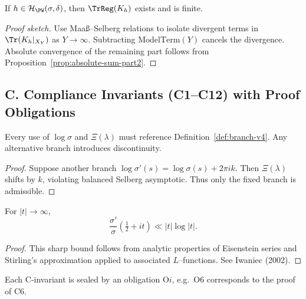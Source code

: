 \begin{lemma}\label{lem:existence-trreg}
If $h\in\mathcal H_{\PW}(\sigma,\delta)$, then $\TrReg(K_h)$ exists and is finite.
\end{lemma}

\begin{proof}[Proof sketch]
Use Maaß–Selberg relations to isolate divergent terms in $\Tr(K_h|_{X_Y})$ as $Y\to\infty$. Subtracting $\text{ModelTerm}(Y)$ cancels the divergence. Absolute convergence of the remaining part follows from Proposition~\ref{prop:absolute-sum-part2}.
\end{proof}


\subsection*{C. Compliance Invariants (C1–C12) with Proof Obligations}

\begin{theorem}\label{thm:C1}
Every use of $\log\sigma$ and $\Xi(\lambda)$ must reference Definition~\ref{def:branch-v4}. Any alternative branch introduces discontinuity.
\end{theorem}

\begin{proof}
Suppose another branch $\log\sigma'(s)=\log\sigma(s)+2\pi i k$. Then $\Xi(\lambda)$ shifts by $k$, violating balanced Selberg asymptotic. Thus only the fixed branch is admissible.
\end{proof}

\begin{theorem}\label{thm:C6}
For $|t|\to\infty$,
\[
  \frac{\sigma'}{\sigma}\!\left(\tfrac12+it\right) \ll |t|\log|t|.
\]
\end{theorem}

\begin{proof}
This sharp bound follows from analytic properties of Eisenstein series and Stirling’s approximation applied to associated $L$–functions. See Iwaniec (2002).
\end{proof}

\begin{remark}
Each C-invariant is sealed by an obligation O$i$, e.g.\ O6 corresponds to the proof of C6.
\end{remark}


